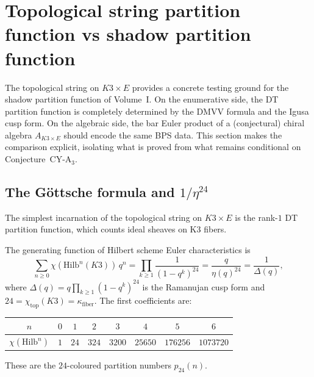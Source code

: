 
\section{Topological string partition function vs shadow partition function}
\label{sec:k3e-topological-string-shadow}

The topological string on $K3 \times E$ provides a concrete testing ground for the shadow partition function of Volume~I. On the enumerative side, the DT partition function is completely determined by the DMVV formula and the Igusa cusp form. On the algebraic side, the bar Euler product of a (conjectural) chiral algebra $A_{K3 \times E}$ should encode the same BPS data. This section makes the comparison explicit, isolating what is proved from what remains conditional on Conjecture~CY-A$_3$.

\subsection{The G\"ottsche formula and $1/\eta^{24}$}
\label{subsec:k3e-gottsche-eta}

The simplest incarnation of the topological string on $K3 \times E$ is the rank-$1$ DT partition function, which counts ideal sheaves on K3 fibers.

\begin{theorem}[G\"ottsche, 1990]
\label{thm:k3e-gottsche-product}
\ClaimStatusProvedElsewhere
The generating function of Hilbert scheme Euler characteristics is
\[
 \sum_{n \geq 0} \chi(\mathrm{Hilb}^n(K3)) \, q^n
 = \prod_{k \geq 1} \frac{1}{(1 - q^k)^{24}}
 = \frac{q}{\eta(q)^{24}}
 = \frac{1}{\Delta(q)},
\]
where $\Delta(q) = q \prod_{k \geq 1}(1 - q^k)^{24}$ is the Ramanujan cusp form and $24 = \chi_{\mathrm{top}}(K3) = \kappa_{\mathrm{fiber}}$. The first coefficients are:
\begin{center}
\begin{tabular}{c|ccccccc}
$n$ & $0$ & $1$ & $2$ & $3$ & $4$ & $5$ & $6$ \\ \hline
$\chi(\mathrm{Hilb}^n)$ & $1$ & $24$ & $324$ & $3200$ & $25650$ & $176256$ & $1073720$
\end{tabular}
\end{center}
These are the $24$-coloured partition numbers $p_{24}(n)$.
\ClaimStatusProvedElsewhere
\end{theorem}

